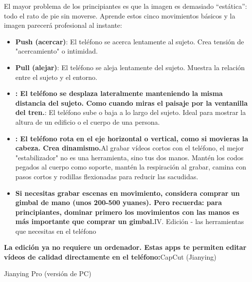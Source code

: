 
El mayor problema de los principiantes es que la imagen es demasiado “estática”: todo el rato de pie sin moverse. Aprende estos cinco movimientos básicos y la imagen parecerá profesional al instante:

\begin{itemize}
  \item \textbf{Push (acercar)}: El teléfono se acerca lentamente al sujeto. Crea tensión de "acercamiento" o intimidad.
  \item \textbf{Pull (alejar)}: El teléfono se aleja lentamente del sujeto. Muestra la relación entre el sujeto y el entorno.
  \item \textbf{: El teléfono se desplaza lateralmente manteniendo la misma distancia del sujeto. Como cuando miras el paisaje por la ventanilla del tren.}: El teléfono sube o baja a lo largo del sujeto. Ideal para mostrar la altura de un edificio o el cuerpo de una persona.
  \item \textbf{: El teléfono rota en el eje horizontal o vertical, como si movieras la cabeza. Crea dinamismo.}Al grabar vídeos cortos con el teléfono, el mejor "estabilizador" no es una herramienta, sino tus dos manos. Mantén los codos pegados al cuerpo como soporte, mantén la respiración al grabar, camina con pasos cortos y rodillas flexionadas para reducir las sacudidas.
  \item \textbf{Si necesitas grabar escenas en movimiento, considera comprar un gimbal de mano (unos 200-500 yuanes). Pero recuerda: para principiantes, dominar primero los movimientos con las manos es más importante que comprar un gimbal.}IV. Edición - las herramientas que necesitas en el teléfono
\end{itemize}

\textbf{La edición ya no requiere un ordenador. Estas apps te permiten editar vídeos de calidad directamente en el teléfono:}CapCut (Jianying)


Jianying Pro (versión de PC)

